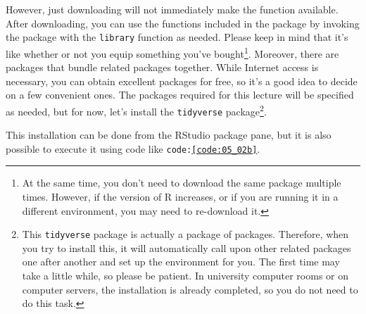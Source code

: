 \documentclass{ltjsbook}
\begin{document}
However, just downloading will not immediately make the function available. After downloading, you can use the functions included in the package by invoking the package with the \texttt{library} function as needed. Please keep in mind that it's like whether or not you equip something you've bought\footnote{At the same time, you don't need to download the same package multiple times. However, if the version of R increases, or if you are running it in a different environment, you may need to re-download it.}.
Moreover, there are packages that bundle related packages together. While Internet access is necessary, you can obtain excellent packages for free, so it's a good idea to decide on a few convenient ones. The packages required for this lecture will be specified as needed, but for now, let's install the \texttt{tidyverse} package\parencite{tidyverse}\footnote{This \texttt{tidyverse} package is actually a package of packages. Therefore, when you try to install this, it will automatically call upon other related packages one after another and set up the environment for you. The first time may take a little while, so please be patient. In university computer rooms or on computer servers, the installation is already completed, so you do not need to do this task.}.




This installation can be done from the RStudio package pane, but it is also possible to execute it using code like \texttt{code:\ref{code:05_02b}}.

\end{document}

